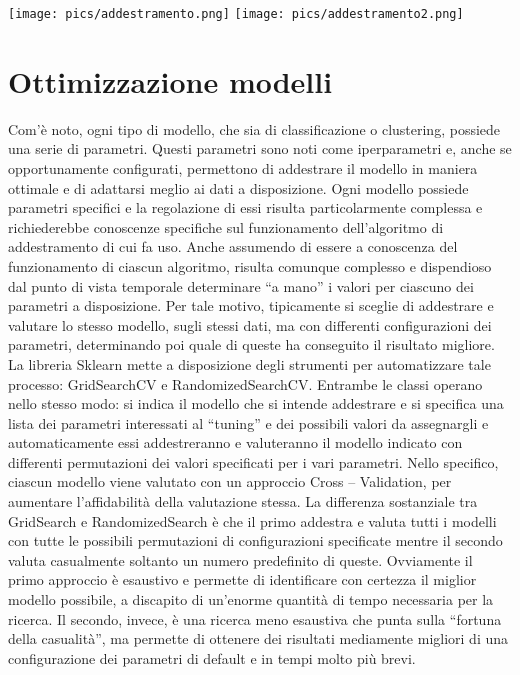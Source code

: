 \documentclass[12pt,oneside]{article}
\begin{document}
        \texttt{[image: pics/addestramento.png]}
        \texttt{[image: pics/addestramento2.png]}
      
\section{Ottimizzazione modelli}\label{ott}
    \begin{justify}
        Com’è noto, ogni tipo di modello, che sia di classificazione o clustering, possiede una serie di parametri. Questi parametri sono noti come iperparametri e, anche se opportunamente configurati, permettono di addestrare il modello in maniera ottimale e di adattarsi meglio ai dati a disposizione. Ogni modello possiede parametri specifici e la regolazione di essi risulta particolarmente complessa e richiederebbe conoscenze specifiche sul funzionamento dell’algoritmo di addestramento di cui fa uso. Anche assumendo di essere a conoscenza del funzionamento di ciascun algoritmo, risulta comunque complesso e dispendioso dal punto di vista temporale determinare “a mano” i valori per ciascuno dei parametri a disposizione. Per tale motivo, tipicamente si sceglie di addestrare e valutare lo stesso modello, sugli stessi dati, ma con differenti configurazioni dei parametri, determinando poi quale di queste ha conseguito il risultato migliore. 
        La libreria Sklearn mette a disposizione degli strumenti per automatizzare tale processo: GridSearchCV e RandomizedSearchCV. Entrambe le classi operano nello stesso modo: si indica il modello che si intende addestrare e si specifica una lista dei parametri interessati al “tuning” e dei possibili valori da assegnargli e automaticamente essi addestreranno e valuteranno il modello indicato con differenti permutazioni dei valori specificati per i vari parametri. Nello specifico, ciascun modello viene valutato con un approccio Cross – Validation, per aumentare l’affidabilità della valutazione stessa. La differenza sostanziale tra GridSearch e RandomizedSearch è che il primo addestra e valuta tutti i modelli con tutte le possibili permutazioni di configurazioni specificate mentre il secondo valuta casualmente soltanto un numero predefinito di queste. Ovviamente il primo approccio è esaustivo e permette di identificare con certezza il miglior modello possibile, a discapito di un’enorme quantità di tempo necessaria per la ricerca. Il secondo, invece, è una ricerca meno esaustiva che punta sulla “fortuna della casualità”, ma permette di ottenere dei risultati mediamente migliori di una configurazione dei parametri di default e in tempi molto più brevi.

\end{justify}
\end{document}
